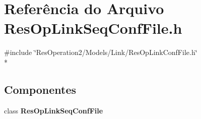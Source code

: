 \section{Referência do Arquivo Res\+Op\+Link\+Seq\+Conf\+File.\+h}
\label{_res_op_link_seq_conf_file_8h}
{\ttfamily \#include \char`\"{}Res\+Operation2/\+Models/\+Link/\+Res\+Op\+Link\+Conf\+File.\+h\char`\"{}}\\*
\subsection*{Componentes}
\begin{DoxyCompactItemize}
\item 
class {\bf Res\+Op\+Link\+Seq\+Conf\+File}
\end{DoxyCompactItemize}
